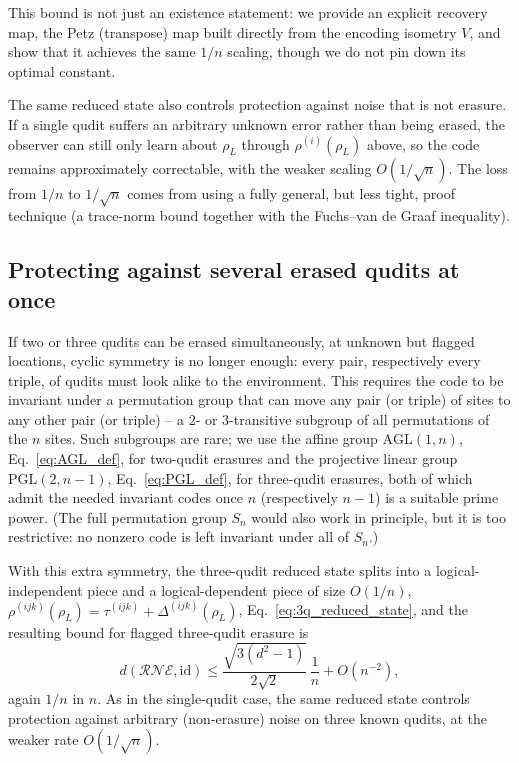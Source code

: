 \documentclass[10pt,twocolumn,superscriptaddress,aps,amsmath,amssymb,citeautoscript,floatfix,prx]{revtex4-2}
\theoremstyle{plain}
\theoremstyle{plain}
\theoremstyle{plain}
\theoremstyle{plain}
\theoremstyle{plain}
\theoremstyle{plain}
\begin{document}
This bound is not just an existence statement: we provide an explicit recovery map, the Petz (transpose) map built directly from the encoding isometry $V$, and show that it achieves the same $1/n$ scaling, though we do not pin down its optimal constant.
 
The same reduced state also controls protection against noise that is not erasure. If a single qudit suffers an arbitrary unknown error rather than being erased, the observer can still only learn about $\rho_L$ through $\rho^{(i)}(\rho_L)$ above, so the code remains approximately correctable, with the weaker scaling $O(1/\sqrt n)$. The loss from $1/n$ to $1/\sqrt n$ comes from using a fully general, but less tight, proof technique (a trace-norm bound together with the Fuchs--van de Graaf inequality).
 
\subsection{Protecting against several erased qudits at once}\label{subsec:summary_multierasure}
 
If two or three qudits can be erased simultaneously, at unknown but flagged locations, cyclic symmetry is no longer enough: every pair, respectively every triple, of qudits must look alike to the environment. This requires the code to be invariant under a permutation group that can move any pair (or triple) of sites to any other pair (or triple) -- a $2$- or $3$-transitive subgroup of all permutations of the $n$ sites. Such subgroups are rare; we use the affine group $\mathrm{AGL}(1,n)$, Eq.~\eqref{eq:AGL_def}, for two-qudit erasures and the projective linear group $\mathrm{PGL}(2,n-1)$, Eq.~\eqref{eq:PGL_def}, for three-qudit erasures, both of which admit the needed invariant codes once $n$ (respectively $n-1$) is a suitable prime power. (The full permutation group $S_n$ would also work in principle, but it is too restrictive: no nonzero code is left invariant under all of $S_n$.)
 
With this extra symmetry, the three-qudit reduced state splits into a logical-independent piece and a logical-dependent piece of size $O(1/n)$, $\rho^{(ijk)}(\rho_L)=\tau^{(ijk)}+\Delta^{(ijk)}(\rho_L)$, Eq.~\eqref{eq:3q_reduced_state}, and the resulting bound for flagged three-qudit erasure is
$$
d(\mathcal R\mathcal N\mathcal E,\mathrm{id})\le \frac{\sqrt{3(d^2-1)}}{2\sqrt2}\,\frac1n+O(n^{-2}),
$$
again $1/n$ in $n$. As in the single-qudit case, the same reduced state controls protection against arbitrary (non-erasure) noise on three known qudits, at the weaker rate $O(1/\sqrt n)$.
 
\end{document}
